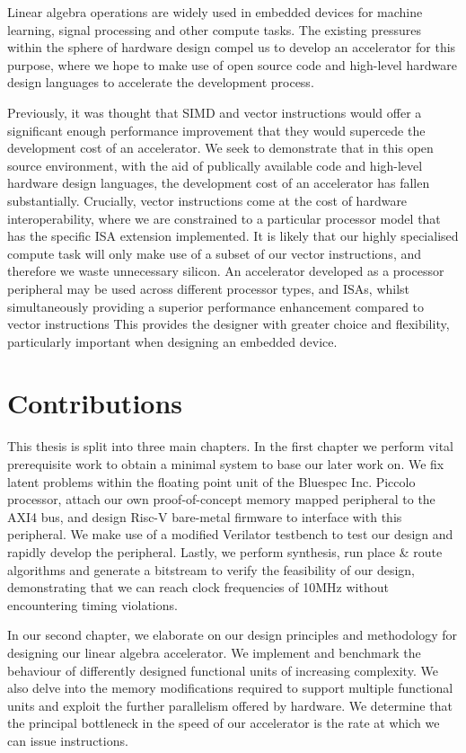 \documentclass[a4paper,8pt]{report}
\begin{document}
Linear algebra operations are widely used in embedded devices for machine
learning, signal processing and other compute tasks. The existing pressures
within the sphere of hardware design compel us to develop an accelerator for
this purpose, where we hope to make use of open source code and high-level
hardware design languages to accelerate the development process.

Previously, it was thought that SIMD and vector instructions would offer a
significant enough performance improvement that they would supercede the
development cost of an accelerator. We seek to demonstrate that in this open
source environment, with the aid of publically available code and high-level
hardware design languages, the development cost of an accelerator has fallen
substantially. Crucially, vector instructions come at the cost of hardware
interoperability, where we are constrained to a particular processor model that
has the specific ISA extension implemented. It is likely that our highly specialised
compute task will only make use of a subset of our vector instructions, and
therefore we waste unnecessary silicon.  An accelerator developed as a processor
peripheral may be used across different processor types, and ISAs, whilst
simultaneously providing a superior performance enhancement compared to vector
instructions This provides the designer with greater choice and flexibility,
particularly important when designing an embedded device.

\section{Contributions}
This thesis is split into three main chapters. In the first chapter we perform
vital prerequisite work to obtain a minimal system to base our later work on.
We fix latent problems within the floating point unit of the Bluespec Inc.
Piccolo processor, attach our own proof-of-concept memory mapped peripheral to
the AXI4 bus, and design Risc-V bare-metal firmware to interface with this
peripheral. We make use of a modified Verilator testbench to test our design
and rapidly develop the peripheral. Lastly, we perform synthesis, run place \&
route algorithms and generate a bitstream to verify the feasibility of our
design, demonstrating that we can reach clock frequencies of 10MHz without
encountering timing violations.

In our second chapter, we elaborate on our design principles and methodology for
designing our linear algebra accelerator. We implement and benchmark the behaviour
of differently designed functional units of increasing complexity. We also delve
into the memory modifications required to support multiple functional units and
exploit the further parallelism offered by hardware. We determine that the
principal bottleneck in the speed of our accelerator is the rate at which we can
issue instructions.
\end{document}
